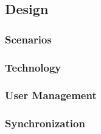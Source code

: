 \subsection{Design}


\subsubsection{Scenarios}
\subsubsection{Technology}

\subsubsection{User Management}
\subsubsection{Synchronization}